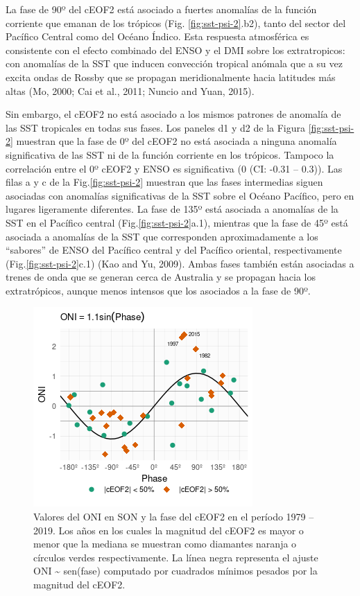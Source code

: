 \documentclass[12pt,oneside]{reedthesis}
\begin{document}
La fase de 90º del cEOF2 está asociado a fuertes anomalías de la función corriente que emanan de los trópicos (Fig. \ref{fig:sst-psi-2}.b2), tanto del sector del Pacífico Central como del Océano Índico.
Esta respuesta atmosférica es consistente con el efecto combinado del ENSO y el DMI sobre los extratropicos: con anomalías de la SST que inducen convección tropical anómala que a su vez excita ondas de Rossby que se propagan meridionalmente hacia latitudes más altas (Mo, 2000; Cai et al., 2011; Nuncio and Yuan, 2015).

Sin embargo, el cEOF2 no está asociado a los mismos patrones de anomalía de las SST tropicales en todas sus fases.
Los paneles d1 y d2 de la Figura \ref{fig:sst-psi-2} muestran que la fase de 0º del cEOF2 no está asociada a ninguna anomalía significativa de las SST ni de la función corriente en los trópicos.
Tampoco la correlación entre el 0º cEOF2 y ENSO es significativa (0 (CI: -0.31 -- 0.3)).
Las filas a y c de la Fig.\ref{fig:sst-psi-2} muestran que las fases intermedias siguen asociadas con anomalías significativas de la SST sobre el Océano Pacífico, pero en lugares ligeramente diferentes.
La fase de 135º está asociada a anomalías de la SST en el Pacífico central (Fig.\ref{fig:sst-psi-2}a.1), mientras que la fase de 45º está asociada a anomalías de la SST que corresponden aproximadamente a los ``sabores'' de ENSO del Pacífico central y del Pacífico oriental, respectivamente (Fig.\ref{fig:sst-psi-2}c.1) (Kao and Yu, 2009).
Ambas fases también están asociadas a trenes de onda que se generan cerca de Australia y se propagan hacia los extratrópicos, aunque menos intensos que los asociados a la fase de 90º.





\begin{figure}
\includegraphics{figures/20-ceofs/enso-phase-1} \caption{Valores del ONI en SON y la fase del cEOF2 en el período 1979 -- 2019.
Los años en los cuales la magnitud del cEOF2 es mayor o menor que la mediana se muestran como diamantes naranja o círculos verdes respectivamente.
La línea negra representa el ajuste ONI \textasciitilde{} sen(fase) computado por cuadrados mínimos pesados por la magnitud del cEOF2.}\label{fig:enso-phase}
\end{figure}
\end{document}
